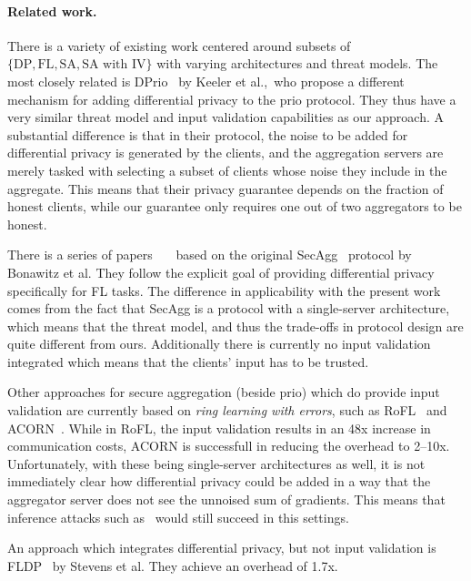 \documentclass{article}
\begin{document}
\paragraph{Related work.}
There is a variety of existing work centered around subsets of
$\{\textrm{DP}, \textrm{FL}, \textrm{SA}, \textrm{SA with IV}\}$ with varying
architectures and threat models. The most closely related is
DPrio~\cite{dprio} by Keeler et al.,\ who propose a different mechanism for
adding differential privacy to the prio protocol. They thus have a very similar
threat model and input validation capabilities as our approach. A substantial
difference is that in their protocol, the noise to be added for differential
privacy is generated by the clients, and the aggregation servers are merely
tasked with selecting a subset of clients whose noise they include in the
aggregate. This means that their privacy guarantee depends on the fraction of
honest clients, while our guarantee only requires one out of two aggregators to
be honest.

There is a series of papers~\cite{Kairouz2021TheDD}~\cite{}~\cite{} based on the original
SecAgg~\cite{secagg} protocol by Bonawitz et al. They follow the explicit goal
of providing differential privacy specifically for FL tasks.
The difference in applicability with the present work comes from the fact that SecAgg is a protocol
with a single-server architecture, which means that the threat model, and thus
the trade-offs in protocol design are quite different from ours. Additionally
there is currently no input validation integrated which means that the clients'
input has to be trusted.

Other approaches for secure aggregation (beside prio) which do provide input validation are currently based on
\textit{ring learning with errors}, such as RoFL~\cite{} and ACORN~\cite{acorn}.
While in RoFL, the input validation results in an 48x increase in communication
costs, ACORN is successfull in reducing the overhead to 2--10x. Unfortunately,
with these being single-server architectures as well, it is not immediately
clear how differential privacy could be added in a way that the aggregator
server does not see the unnoised sum of gradients. This means that inference
attacks such as~\cite{7958568} would still succeed in this settings.

An approach which integrates differential privacy, but not input validation
is FLDP~\cite{Stevens2021EfficientDP} by Stevens et al. They achieve an overhead
of 1.7x.
\end{document}
